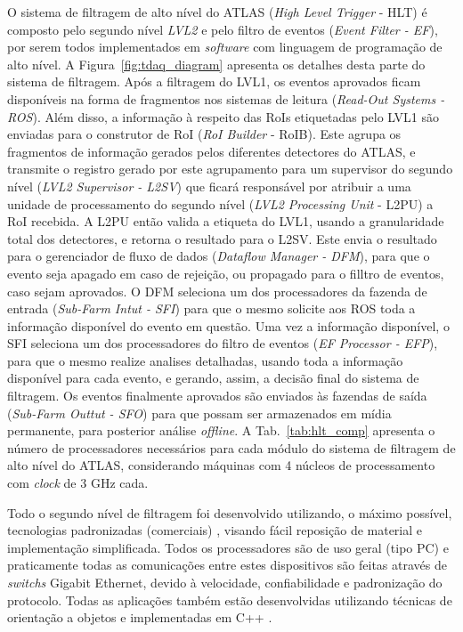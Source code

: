 O sistema de filtragem de alto nível do ATLAS (\emph{High Level Trigger} - HLT) é composto pelo segundo nível \emph{LVL2} e pelo filtro de eventos (\emph{Event Filter - EF}), por serem todos implementados em \emph{software} com linguagem de programação de alto nível. A Figura~\ref{fig:tdaq_diagram} apresenta os detalhes desta parte do sistema de filtragem. Após a filtragem do LVL1, os eventos aprovados ficam disponíveis na forma de fragmentos nos sistemas de leitura (\emph{Read-Out Systems - ROS}). Além disso, a informação à respeito das RoIs etiquetadas pelo LVL1 são enviadas para o  construtor de RoI (\emph{RoI Builder} - RoIB). Este agrupa os fragmentos de informação gerados pelos diferentes detectores do ATLAS, e transmite o registro gerado por este agrupamento para um supervisor do segundo nível (\emph{LVL2 Supervisor - L2SV}) que ficará responsável por atribuir a uma unidade de processamento do segundo nível  (\emph{LVL2 Processing Unit} - L2PU) a RoI recebida. A L2PU então valida a etiqueta do LVL1, usando a granularidade total dos detectores, e retorna o resultado para o L2SV. Este envia o resultado para o gerenciador de fluxo de dados (\emph{Dataflow Manager - DFM}), para que o evento seja apagado em caso de rejeição, ou propagado para o filltro de eventos, caso sejam aprovados.  O DFM seleciona um dos processadores da fazenda de entrada (\emph{Sub-Farm Intut - SFI}) para que o mesmo solicite aos ROS toda a informação disponível do evento em questão. Uma vez a informação disponível, o SFI seleciona um dos processadores do filtro de eventos (\emph{EF Processor - EFP}), para que o mesmo realize analises detalhadas, usando toda a informação disponível para cada evento, e gerando, assim, a decisão final do sistema de filtragem. Os eventos finalmente aprovados são enviados às fazendas de saída (\emph{Sub-Farm Outtut - SFO}) para que possam ser armazenados em mídia permanente, para posterior análise \emph{offline}. A Tab.~\ref{tab:hlt_comp} apresenta o número de processadores necessários para cada módulo do sistema de filtragem de alto nível do ATLAS, considerando máquinas com 4 núcleos de processamento com \emph{clock} de 3 GHz cada.

Todo o segundo nível de filtragem foi desenvolvido utilizando, o máximo possível, tecnologias padronizadas (comerciais) \cite{bib:paper_lvl2}, visando fácil reposição de material e implementação simplificada. Todos os processadores são de uso geral (tipo PC) e praticamente todas as comunicações entre estes dispositivos são feitas através de \emph{switchs} Gigabit Ethernet, devido à velocidade, confiabilidade e padronização do protocolo. Todas as aplicações também estão desenvolvidas utilizando técnicas de orientação a objetos e implementadas em C++ \cite{bib:herbert_schildt_c++}.

